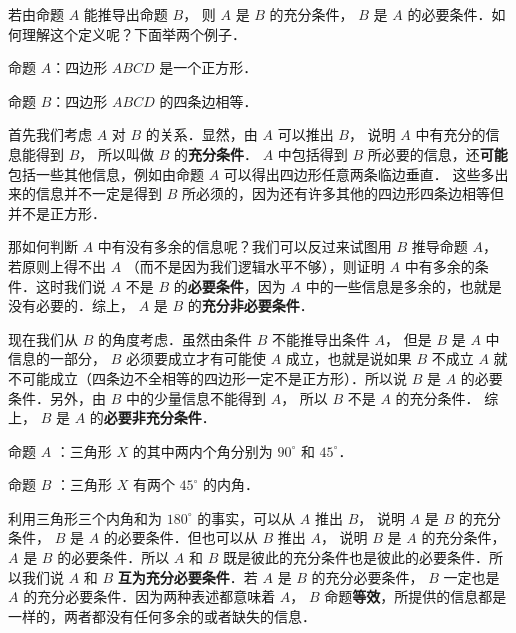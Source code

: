 

若由命题 $A$ 能推导出命题 $B$， 则 $A$ 是 $B$ 的充分条件， $B$ 是 $A$ 的必要条件．如何理解这个定义呢？下面举两个例子．

\begin{example}{}
命题 $A$：四边形 $ABCD$ 是一个正方形．

命题 $B$：四边形 $ABCD$ 的四条边相等．

首先我们考虑 $A$ 对 $B$ 的关系．显然，由 $A$ 可以推出 $B$， 说明 $A$ 中有充分的信息能得到 $B$， 所以叫做 $B$ 的\textbf{充分条件}． $A$ 中包括得到 $B$ 所必要的信息，还\textbf{可能}包括一些其他信息，例如由命题 $A$ 可以得出四边形任意两条临边垂直． 这些多出来的信息并不一定是得到 $B$ 所必须的，因为还有许多其他的四边形四条边相等但并不是正方形．

那如何判断 $A$ 中有没有多余的信息呢？我们可以反过来试图用 $B$ 推导命题 $A$， 若原则上得不出 $A$ （而不是因为我们逻辑水平不够），则证明 $A$ 中有多余的条件．这时我们说 $A$ 不是 $B$ 的\textbf{必要条件}，因为 $A$ 中的一些信息是多余的，也就是没有必要的．综上， $A$ 是 $B$ 的\textbf{充分非必要条件}．

现在我们从 $B$ 的角度考虑．虽然由条件 $B$ 不能推导出条件 $A$， 但是 $B$ 是 $A$ 中信息的一部分， $B$ 必须要成立才有可能使 $A$ 成立，也就是说如果 $B$ 不成立 $A$ 就不可能成立（四条边不全相等的四边形一定不是正方形）．所以说 $B$ 是 $A$ 的必要条件．另外，由 $B$ 中的少量信息不能得到 $A$， 所以 $B$ 不是 $A$ 的充分条件． 综上， $B$ 是 $A$ 的\textbf{必要非充分条件}．
\end{example}


\begin{example}{}
命题 $A$ ：三角形 $X$ 的其中两内个角分别为 $90^\circ$ 和 $45^\circ$．

命题 $B$ ：三角形 $X$ 有两个 $45^\circ$ 的内角．

利用三角形三个内角和为 $180^\circ$ 的事实，可以从 $A$ 推出 $B$， 说明 $A$ 是 $B$ 的充分条件， $B$ 是 $A$ 的必要条件．但也可以从 $B$ 推出 $A$， 说明 $B$ 是 $A$ 的充分条件， $A$ 是 $B$ 的必要条件．所以 $A$ 和 $B$ 既是彼此的充分条件也是彼此的必要条件．所以我们说 $A$ 和 $B$ \textbf{互为充分必要条件}．若 $A$ 是 $B$ 的充分必要条件， $B$ 一定也是 $A$ 的充分必要条件．因为两种表述都意味着 $A$，  $B$ 命题\textbf{等效}，所提供的信息都是一样的，两者都没有任何多余的或者缺失的信息．
\end{example}

